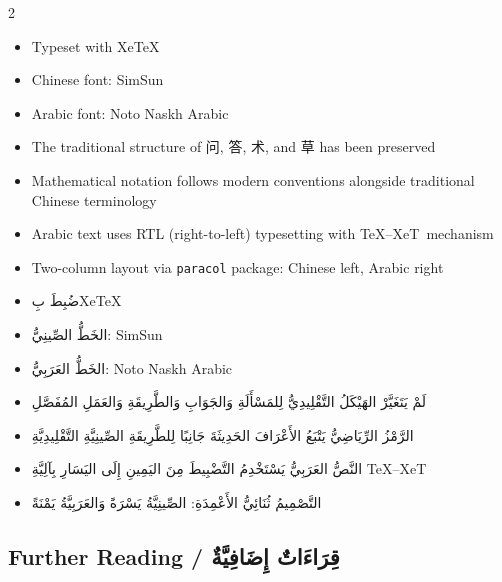 \documentclass[11pt,a4paper]{article}
\newcommand{\ar}[1]{\arabicfont\beginR #1\endR}
\providecommand{\TeXXeT}{TeX--XeT}
\newcommand{\zhtext}[1]{{\chinese #1}}
\newenvironment{bilingual}{%
  \begin{paracol}{2}
}{%
  \end{paracol}
}
\begin{document}
\begin{bilingual}

\begin{leftcolumn*}
\begin{itemize}
  \item Typeset with XeTeX
  \item Chinese font: SimSun
  \item Arabic font: Noto Naskh Arabic
  \item The traditional structure of \zhtext{问}, \zhtext{答}, \zhtext{术}, and \zhtext{草} has been preserved
  \item Mathematical notation follows modern conventions alongside traditional Chinese terminology
  \item Arabic text uses RTL (right-to-left) typesetting with \TeXXeT\ mechanism
  \item Two-column layout via \texttt{paracol} package: Chinese left, Arabic right
\end{itemize}
\end{leftcolumn*}

\begin{rightcolumn*}
\begin{itemize}
  \item \ar{ضُبِطَ بِXeTeX}
  \item \ar{الخَطُّ الصِّينِيُّ: SimSun}
  \item \ar{الخَطُّ العَرَبِيُّ: Noto Naskh Arabic}
  \item \ar{لَمْ يَتَغَيَّرْ الهَيْكَلُ التَّقْلِيدِيُّ لِلمَسْأَلَةِ وَالجَوَابِ وَالطَّرِيقَةِ وَالعَمَلِ المُفَصَّلِ}
  \item \ar{الرَّمْزُ الرِّيَاضِيُّ يَتْبَعُ الأَعْرَافَ الحَدِيثَةَ جَانِبًا لِلطَّرِيقَةِ الصِّينِيَّةِ التَّقْلِيدِيَّةِ}
  \item \ar{النَّصُّ العَرَبِيُّ يَسْتَخْدِمُ التَّضْبِيطَ مِنَ اليَمِينِ إِلَى اليَسَارِ بِآلِيَّةِ \TeXXeT}
  \item \ar{التَّصْمِيمُ ثُنَائِيُّ الأَعْمِدَةِ: الصِّينِيَّةُ يَسْرَةً وَالعَرَبِيَّةُ يَمْنَةً}
\end{itemize}
\end{rightcolumn*}

\end{bilingual}

\vspace{1em}

\subsection*{Further Reading / \ar{قِرَاءَاتٌ إِضَافِيَّةٌ}}
\end{document}
